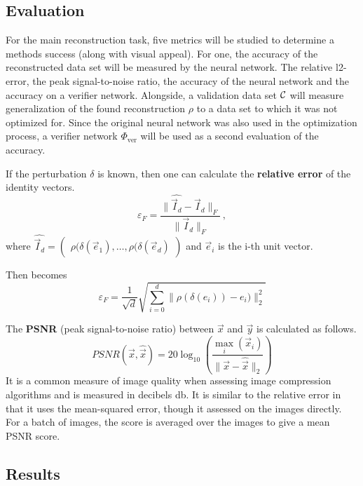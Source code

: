 \subsection{Evaluation}




For the main reconstruction task, 
five metrics will be studied to determine a methods success (along with visual appeal).
For one, the accuracy of the reconstructed data set will be measured by the neural network.
The relative l2-error, the peak signal-to-noise ratio, the accuracy of the neural network and the accuracy on a verifier network.
Alongside, a validation data set $\mathcal C$ will measure generalization of the found reconstruction $\rho$ to a data set to which it was not optimized for.
Since the original neural network was also used in the optimization process, a verifier network $\Phi_{\text{ver}}$ will be used as a second evaluation of the accuracy.

If the perturbation $\delta$ is known, then one can calculate the \textbf{relative error} of the identity vectors. 
\begin{equation}
\label{eqn:relerror}
    \varepsilon_F = \frac {\|\widehat {\vec I_d} - \vec I_d\|_F} {\|\vec I_d\|_F} \,,
\end{equation}
where $\widehat {\vec I_d} = \begin{pmatrix} \rho (\delta (\vec e_1), \dots, \rho (\delta (\vec e_d) \end{pmatrix}$ and $\vec e_i$ is the i-th unit vector.

Then  becomes
\[
    \varepsilon_F = \frac 1 {\sqrt d} \sqrt{ \sum_{i=0}^d \|\rho (\delta (e_i)) - e_i)\|_2^2}
\]

The \textbf{PSNR} (peak signal-to-noise ratio) between $\vec x$ and $\vec y$ is calculated as follows.
\[
    PSNR(\vec x, \hat {\vec x}) = 20 \log_{10} \left (\frac {\max_i(\vec x_i)} {\|\vec x-\hat {\vec x}\|_2} \right )
\]
It is a common measure of image quality when assessing image compression algorithms and is measured in decibels db.
It is similar to the relative error in that it uses the mean-squared error, though it assessed on the images directly.
For a batch of images, the score is averaged over the images to give a mean PSNR score.

\subsection{Results}




